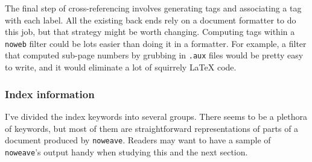 \documentclass{article}
\begin{document}
The final step of cross-referencing involves generating tags and
associating a tag with each label.
All the existing back ends rely on a document formatter to do this
job, but that strategy might be worth changing.
Computing tags within a {\tt noweb} filter could be lots easier than
doing it in a formatter.
For example, a filter that computed sub-page numbers by grubbing in
{\tt .aux} files would be pretty easy to write, and it would eliminate
a lot of squirrely {\LaTeX} code.


\subsubsection{Index information}

I've divided the index keywords into several groups.
There seems to be a plethora of keywords, but most of them are
straightforward representations of parts of a document produced by
{\tt noweave}.  Readers may want to have a sample of {\tt noweave}'s
output handy when studying this and the next section.
\end{document}

